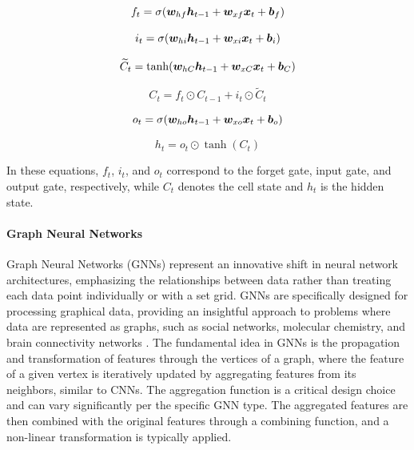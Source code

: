\begin{equation}
f_t = \sigma(\bm {w}_{hf}\bm {h}_{t-1} + \bm {w}_{xf}\bm {x}_t + \bm {b}_f)
\end{equation}

\begin{equation}
i_t = \sigma(\bm {w}_{hi}\bm {h}_{t-1} + \bm {w}_{xi}\bm {x}_t + \bm {b}_i)
\end{equation}

\begin{equation}
\widetilde{C}_t = \tanh(\bm {w}_{hC}\bm {h}_{t-1} + \bm {w}_{xC}\bm {x}_t + \bm {b}_C)
\end{equation}

\begin{equation}
C_t = f_t \odot C_{t-1} + i_t \odot \widetilde{C}_t
\end{equation}

\begin{equation}
o_t = \sigma(\bm {w}_{ho}\bm {h}_{t-1} + \bm {w}_{xo}\bm {x}_t + \bm {b}_o)
\end{equation}

\begin{equation}
h_t = o_t \odot \tanh(C_t)
\end{equation}

In these equations, $f_t$, $i_t$, and $o_t$ correspond to the forget gate, input gate, and output gate, respectively, while $C_t$ denotes the cell state and $h_t$ is the hidden state.

\paragraph{Graph Neural Networks}

Graph Neural Networks (GNNs) represent an innovative shift in neural network architectures, emphasizing the relationships between data rather than treating each data point individually or with a set grid. GNNs are specifically designed for processing graphical data, providing an insightful approach to problems where data are represented as graphs, such as social networks, molecular chemistry, and brain connectivity networks . The fundamental idea in GNNs is the propagation and transformation of features through the vertices of a graph, where the feature of a given vertex is iteratively updated by aggregating features from its neighbors, similar to CNNs. The aggregation function is a critical design choice and can vary significantly per the specific GNN type. The aggregated features are then combined with the original features through a combining function, and a non-linear transformation is typically applied. 

